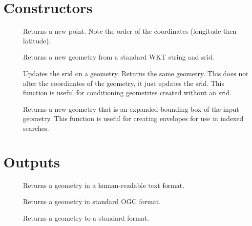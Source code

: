 \documentclass[a4paper,11pt,english]{sphinxmanual}
\begin{document}
\section{Constructors}
\label{\detokenize{postgis-functions:constructors}}\begin{description}
\item[{}] \leavevmode
Returns a new point. Note the order of the coordinates (longitude then latitude).

\item[{}] \leavevmode
Returns a new geometry from a standard WKT string and srid.

\item[{}] \leavevmode
Updates the srid on a geometry.  Returns the same geometry.  This does not alter the coordinates of the geometry, it just updates the srid. This function is useful for conditioning geometries created without an srid.

\item[{}] \leavevmode
Returns a new geometry that is an expanded bounding box of the input geometry.  This function is useful for creating envelopes for use in indexed searches.

\end{description}


\section{Outputs}
\label{\detokenize{postgis-functions:outputs}}\begin{description}
\item[{}] \leavevmode
Returns a geometry in a human-readable text format.

\item[{}] \leavevmode
Returns a geometry in standard OGC {\hyperref[\detokenize{glossary:term-gml}]{}} format.

\item[{}] \leavevmode
Returns a geometry to a standard  format.

\end{description}
\end{document}
